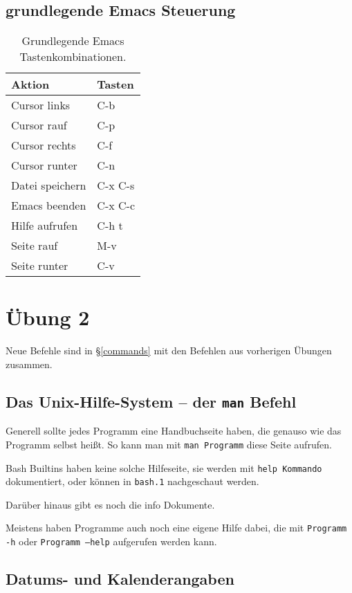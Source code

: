 \section{grundlegende Emacs Steuerung}

\begin{table}[htb]
\begin{center}
\begin{tabular}{ll}
Aktion & Tasten \\
\hline
Cursor links & C-b \\
Cursor rauf & C-p \\
Cursor rechts & C-f \\
Cursor runter & C-n \\
Datei speichern & C-x C-s \\
Emacs beenden & C-x C-c \\
Hilfe aufrufen & C-h t \\
Seite rauf & M-v \\
Seite runter & C-v \\
\end{tabular}
\end{center}
\caption{Grundlegende Emacs Tastenkombinationen.}
\end{table}

\chapter{Übung 2}

Neue Befehle sind in §\ref{commands} mit den Befehlen aus vorherigen Übungen zusammen.

\section{Das Unix-Hilfe-System -- der \texttt{man} Befehl}

Generell sollte jedes Programm eine Handbuchseite haben, die genauso wie das Programm selbst heißt. So kann man mit \texttt{man Programm} diese Seite aufrufen.

Bash Builtins haben keine solche Hilfeseite, sie werden mit \texttt{help Kommando} dokumentiert, oder können in \texttt{bash.1} nachgeschaut werden.

Darüber hinaus gibt es noch die info Dokumente.

Meistens haben Programme auch noch eine eigene Hilfe dabei, die mit \texttt{Programm -h} oder \texttt{Programm --help} aufgerufen werden kann.

\section{Datums- und Kalenderangaben}

